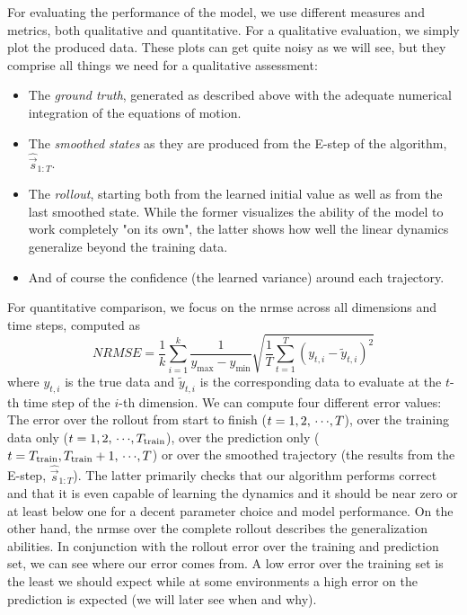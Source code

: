 	For evaluating the performance of the model, we use different measures and metrics, both qualitative and quantitative. For a qualitative evaluation, we simply plot the produced data. These plots can get quite noisy as we will see, but they comprise all things we need for a qualitative assessment:
	\begin{itemize}
		\item The \emph{ground truth}, generated as described above with the adequate numerical integration of the equations of motion.
		\item The \emph{smoothed states} as they are produced from the E-step of the \algname algorithm, \ie \(\hat{\vec{s}}_{1:T}\).
		\item The \emph{rollout}, starting both from the learned initial value as well as from the last smoothed state. While the former visualizes the ability of the model to work completely "on its own", the latter shows how well the linear dynamics generalize beyond the training data.
		\item And of course the confidence (\ie the learned variance) around each trajectory.
	\end{itemize}
	For quantitative comparison, we focus on the \ac{nrmse} across all dimensions and time steps, computed as
	\begin{equation*}
		\mathit{NRMSE} = \frac{1}{k} \sum_{i = 1}^{k} \frac{1}{y_\mathrm{max} - y_\mathrm{min}} \sqrt{ \frac{1}{T} \sum_{t = 1}^{T} (y_{t, i} - \tilde{y}_{t, i})^2 }
	\end{equation*}
	where \( y_{t, i} \) is the true data and \( \tilde{y}_{t, i} \) is the corresponding data to evaluate at the \(t\)-th time step of the \(i\)-th dimension. We can compute four different error values: The error over the rollout from start to finish (\( t = 1, 2, \,\cdots\!, T \)), over the training data only (\( t = 1, 2, \,\cdots\!, T_{\mathrm{train}} \)), over the prediction only (\( t = T_{\mathrm{train}}, T_{\mathrm{train}} + 1, \,\cdots\!, T \)) or over the smoothed trajectory (\ie the results from the E-step, \(  \hat{\vec{s}}_{1:T} \)). The latter primarily checks that our algorithm performs correct and that it is even capable of learning the dynamics and it should be near zero or at least below one for a decent parameter choice and model performance. On the other hand, the \ac{nrmse} over the complete rollout describes the generalization abilities. In conjunction with the rollout error over the training and prediction set, we can see where our error comes from. A low error over the training set is the least we should expect while at some environments a high error on the prediction is expected (we will later see when and why).

